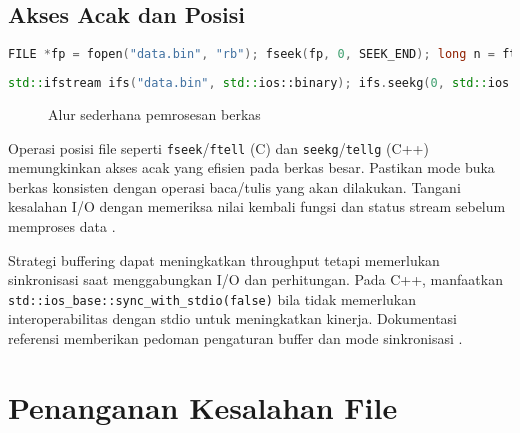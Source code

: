 \documentclass[../main.tex]{subfiles}
\begin{document}
\subsection{Akses Acak dan Posisi}
\begin{lstlisting}[language=C, caption={fseek/ftell di C}]
FILE *fp = fopen("data.bin", "rb"); fseek(fp, 0, SEEK_END); long n = ftell(fp); rewind(fp);
\end{lstlisting}

\begin{lstlisting}[language=C++, caption={seekg/tellg di C++}]
std::ifstream ifs("data.bin", std::ios::binary); ifs.seekg(0, std::ios::end); auto n = ifs.tellg(); ifs.seekg(0);
\end{lstlisting}

\begin{figure}[h]
  \centering
  \caption{Alur sederhana pemrosesan berkas}
\end{figure}
Operasi posisi file seperti \texttt{fseek}/\texttt{ftell} (C) dan \texttt{seekg}/\texttt{tellg} (C++) memungkinkan akses acak yang efisien pada berkas besar. Pastikan mode buka berkas konsisten dengan operasi baca/tulis yang akan dilakukan. Tangani kesalahan I/O dengan memeriksa nilai kembali fungsi dan status stream sebelum memproses data \parencite{gnu-c-manual,cpp-reference}.

Strategi buffering dapat meningkatkan throughput tetapi memerlukan sinkronisasi saat menggabungkan I/O dan perhitungan. Pada C++, manfaatkan \texttt{std::ios\_base::sync\_with\_stdio(false)} bila tidak memerlukan interoperabilitas dengan stdio untuk meningkatkan kinerja. Dokumentasi referensi memberikan pedoman pengaturan buffer dan mode sinkronisasi \parencite{cplusplus-io,cpp-reference}.

\section{Penanganan Kesalahan File}
\end{document}
